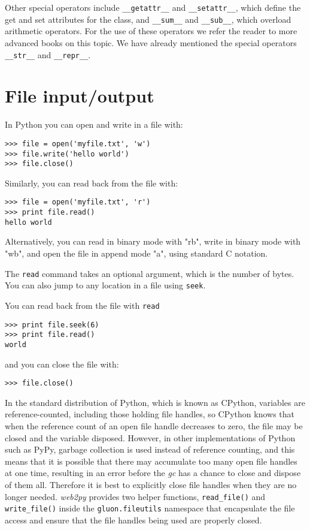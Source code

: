 \documentclass[justified,sixbynine,notoc]{tufte-book}
\def\ft{\small\tt}
\def\inxx#1{\index{#1}}
\begin{document}
\begin{fullwidth}
Other special operators include {\ft \_\_getattr\_\_} and {\ft \_\_setattr\_\_}, which define the get and set attributes for the class, and {\ft \_\_sum\_\_} and {\ft \_\_sub\_\_}, which overload arithmetic operators. For the use of these operators we refer the reader to more advanced books on this topic. We have already mentioned the special operators {\ft \_\_str\_\_} and {\ft \_\_repr\_\_}.

\goodbreak\section{File input/output}

\inxx{file.read} \inxx{file.write}

In Python you can open and write in a file with:
\begin{lstlisting}
>>> file = open('myfile.txt', 'w')
>>> file.write('hello world')
>>> file.close()
\end{lstlisting}

Similarly, you can read back from the file with:
\begin{lstlisting}
>>> file = open('myfile.txt', 'r')
>>> print file.read()
hello world
\end{lstlisting}

Alternatively, you can read in binary mode with "rb", write in binary mode with "wb", and open the file in append mode "a", using standard C notation.

The {\ft read} command takes an optional argument, which is the number of bytes. You can also jump to any location in a file using {\ft seek}.
\inxx{file.seek}

You can read back from the file with {\ft read}
\begin{lstlisting}
>>> print file.seek(6)
>>> print file.read()
world
\end{lstlisting}
\noindent and you can close the file with:
\begin{lstlisting}
>>> file.close()
\end{lstlisting}

In the standard distribution of Python, which is known as CPython, variables are reference-counted, including those holding file handles, so CPython knows that when the reference count of an open file handle decreases to zero, the file may be closed and the variable disposed.  However, in other implementations of Python such as PyPy, garbage collection is used instead of reference counting, and this means that it is possible that there may accumulate too many open file handles at one time, resulting in an error before the {\it gc} has a chance to close and dispose of them all.  Therefore it is best to explicitly close file handles when they are no longer needed.  {\it web2py} provides two helper functions, {\ft read\_file()} and {\ft write\_file()} inside the {\ft gluon.fileutils} namespace that encapsulate the file access and ensure that the file handles being used are properly closed.


\end{fullwidth}
\end{document}
